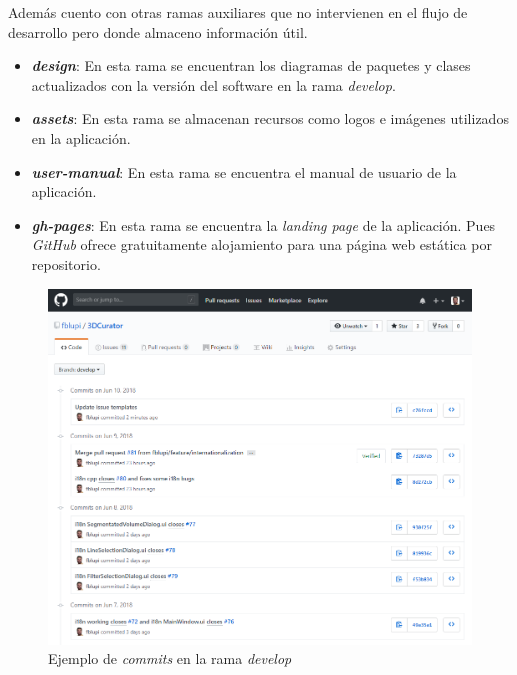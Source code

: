 Además cuento con otras ramas auxiliares que no intervienen en el flujo de desarrollo pero donde almaceno información útil.

\begin{itemize}
	\item \textbf{\textit{design}}: En esta rama se encuentran los diagramas de paquetes y clases actualizados con la versión del software en la rama \textit{develop}.
	\item \textbf{\textit{assets}}: En esta rama se almacenan recursos como logos e imágenes utilizados en la aplicación.
	\item \textbf{\textit{user-manual}}: En esta rama se encuentra el manual de usuario de la aplicación.
	\item \textbf{\textit{gh-pages}}: En esta rama se encuentra la \textit{landing page} de la aplicación. Pues \textit{GitHub} ofrece gratuitamente alojamiento para una página web estática por repositorio.
\end{itemize}


\begin{figure}[H]
	\centering
	\includegraphics[width=12cm]{imagenes/planificacion/commits}
	\caption{Ejemplo de \textit{commits} en la rama \textit{develop}}
	\label{fig:planificacion/commits}
\end{figure}

